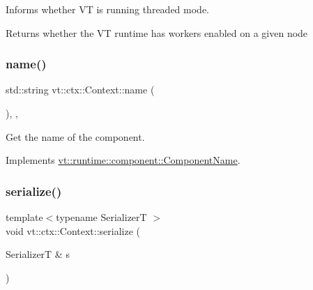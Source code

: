 Informs whether VT is running threaded mode. 

\begin{DoxyReturn}{Returns}
whether the VT runtime has workers enabled on a given node 
\end{DoxyReturn}
\mbox{\label{structvt_1_1ctx_1_1_context_a6bef35c171d45feb409d7b6aa6168996}} 
\subsubsection{\texorpdfstring{name()}{name()}}
{\footnotesize\ttfamily std\+::string vt\+::ctx\+::\+Context\+::name (\begin{DoxyParamCaption}{ }\end{DoxyParamCaption})\hspace{0.3cm}{\ttfamily [inline]}, {\ttfamily [override]}, {\ttfamily [virtual]}}



Get the name of the component. 



Implements \hyperlink{structvt_1_1runtime_1_1component_1_1_component_name_a33c06229bb605a2b2ceff68830d6d773}{vt\+::runtime\+::component\+::\+Component\+Name}.

\mbox{\label{structvt_1_1ctx_1_1_context_a510b7a30a4e10b95528a8a9c2306a075}} 
\subsubsection{\texorpdfstring{serialize()}{serialize()}}
{\footnotesize\ttfamily template$<$typename SerializerT $>$ \\
void vt\+::ctx\+::\+Context\+::serialize (\begin{DoxyParamCaption}\item[{SerializerT \&}]{s }\end{DoxyParamCaption})\hspace{0.3cm}{\ttfamily [inline]}}

\mbox{\label{structvt_1_1ctx_1_1_context_ab61a961c47c8fc6393df8c121ade3aa2}} 
